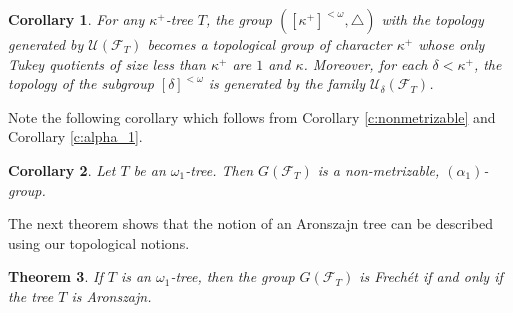\documentclass{amsart}
\theoremstyle{plain}
\newtheorem{theorem}{Theorem}[section]
\newtheorem{corollary}[theorem]{Corollary}
\theoremstyle{definition}
\numberwithin{equation}{section}
\renewcommand{\d}{\delta}
\renewcommand{\k}{\kappa}
\renewcommand{\o}{\omega}
\newcommand{\cu}{\mathcal U}
\begin{document}
\begin{corollary}\label{c:treecor}
	For any $\k^+$-tree $T$, the group $([\k^+]^{<\o},\triangle)$ with the topology generated by $\cu(\mathcal F_T)$ becomes a topological group of character $\k^+$ whose only Tukey quotients of size less than $\k^+$ are $1$ and $\k$.
	Moreover, for each $\d<\k^+$, the topology of the subgroup $[\d]^{<\o}$ is generated by the family $\cu_{\d}\left(\mathcal F_T\right)$.
\end{corollary}

Note the following corollary which follows from Corollary \ref{c:nonmetrizable} and Corollary \ref{c:alpha_1}.

\begin{corollary}\label{c:metrizable}
    Let $T$ be an $\o_1$-tree. Then $G(\mathcal F_T)$ is a non-metrizable, $(\alpha_1)$-group.
\end{corollary}

The next theorem shows that the notion of an Aronszajn tree can be described using our topological notions.

\begin{theorem}\label{t:treefrechet}
    If $T$ is an $\o_1$-tree, then the group $G(\mathcal F_T)$ is Frech\'et if and only if the tree $T$ is Aronszajn.
\end{theorem}
\end{document}
